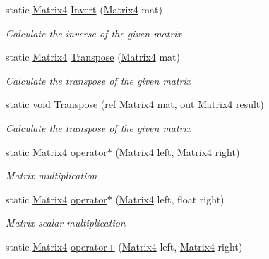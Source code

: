 \begin{DoxyCompactItemize}
static \hyperlink{struct_open_t_k_1_1_matrix4}{Matrix4} \hyperlink{struct_open_t_k_1_1_matrix4_a50b8d53e584fa4b41621ed03889dc47c}{Invert} (\hyperlink{struct_open_t_k_1_1_matrix4}{Matrix4} mat)
\begin{DoxyCompactList}\small\item\em Calculate the inverse of the given matrix \end{DoxyCompactList}\item 
static \hyperlink{struct_open_t_k_1_1_matrix4}{Matrix4} \hyperlink{struct_open_t_k_1_1_matrix4_a6b208b99928f429451c687b8a2e7fe2a}{Transpose} (\hyperlink{struct_open_t_k_1_1_matrix4}{Matrix4} mat)
\begin{DoxyCompactList}\small\item\em Calculate the transpose of the given matrix \end{DoxyCompactList}\item 
static void \hyperlink{struct_open_t_k_1_1_matrix4_abc37cdd96af73a324d6a05fe48477246}{Transpose} (ref \hyperlink{struct_open_t_k_1_1_matrix4}{Matrix4} mat, out \hyperlink{struct_open_t_k_1_1_matrix4}{Matrix4} result)
\begin{DoxyCompactList}\small\item\em Calculate the transpose of the given matrix \end{DoxyCompactList}\item 
static \hyperlink{struct_open_t_k_1_1_matrix4}{Matrix4} \hyperlink{struct_open_t_k_1_1_matrix4_a213d1b0df28b91d6f2b5d6b4a8c2a719}{operator$\ast$} (\hyperlink{struct_open_t_k_1_1_matrix4}{Matrix4} left, \hyperlink{struct_open_t_k_1_1_matrix4}{Matrix4} right)
\begin{DoxyCompactList}\small\item\em Matrix multiplication \end{DoxyCompactList}\item 
static \hyperlink{struct_open_t_k_1_1_matrix4}{Matrix4} \hyperlink{struct_open_t_k_1_1_matrix4_ac9116cceade296e536631fd86d0c48d3}{operator$\ast$} (\hyperlink{struct_open_t_k_1_1_matrix4}{Matrix4} left, float right)
\begin{DoxyCompactList}\small\item\em Matrix-\/scalar multiplication \end{DoxyCompactList}\item 
static \hyperlink{struct_open_t_k_1_1_matrix4}{Matrix4} \hyperlink{struct_open_t_k_1_1_matrix4_aec9fd33994b3a16146e9ea4f9d29b0f3}{operator+} (\hyperlink{struct_open_t_k_1_1_matrix4}{Matrix4} left, \hyperlink{struct_open_t_k_1_1_matrix4}{Matrix4} right)

\end{DoxyCompactItemize}

